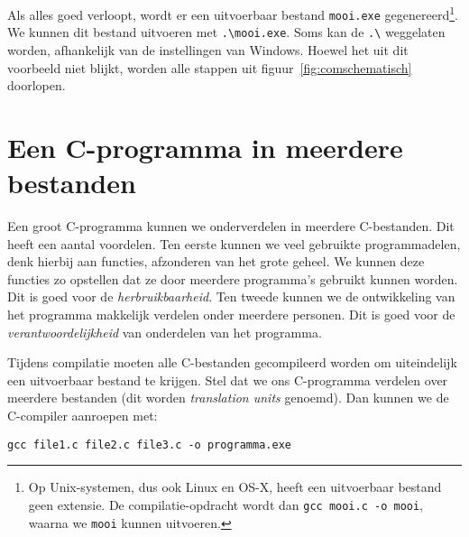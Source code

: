 Als alles goed verloopt, wordt er een uitvoerbaar bestand \texttt{mooi.exe} gegenereerd\footnote{Op Unix-systemen, dus ook Linux en OS-X, heeft een uitvoerbaar bestand geen extensie. De compilatie-opdracht wordt dan \texttt{gcc mooi.c -o mooi}, waarna we \texttt{mooi} kunnen uitvoeren.}. We kunnen dit bestand uitvoeren met \texttt{.\textbackslash mooi.exe}. Soms kan de \texttt{.\textbackslash} weggelaten worden, afhankelijk van de instellingen van Windows.
Hoewel het uit dit voorbeeld niet blijkt, worden alle stappen uit figuur~\ref{fig:comschematisch} doorlopen.


\section{Een C-programma in meerdere bestanden}

Een groot C-programma kunnen we onderverdelen in meerdere C-bestanden. Dit heeft een aantal voordelen. Ten eerste kunnen we veel gebruikte programmadelen, denk hierbij aan functies, afzonderen van het grote geheel. We kunnen deze functies zo opstellen dat ze door meerdere programma's gebruikt kunnen worden. Dit is goed voor de \textsl{herbruikbaarheid}. Ten tweede kunnen we de ontwikkeling van het programma makkelijk verdelen onder meerdere personen. Dit is goed voor de \textsl{verantwoordelijkheid} van onderdelen van het programma.

Tijdens compilatie moeten alle C-bestanden gecompileerd worden om uiteindelijk een uitvoerbaar bestand te krijgen. Stel dat we ons C-programma verdelen over meerdere bestanden (dit worden \textsl{translation units} genoemd). Dan kunnen we de C-compiler aanroepen met:

\begin{lstlisting}[style=lstoneline]
gcc file1.c file2.c file3.c -o programma.exe
\end{lstlisting}

